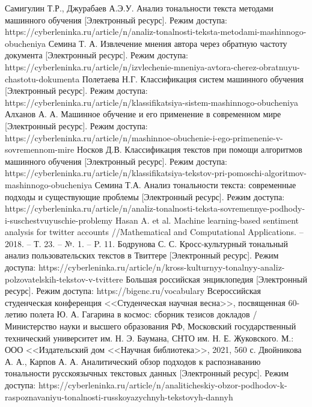 \documentclass[a4paper,14pt, unknownkeysallowed]{extreport}
\begin{document}
\begin{thebibliography}{100}
	 Самигулин Т.Р., Джурабаев А.Э.У. Анализ тональности текста методами машинного обучения [Электронный ресурс]. Режим доступа: https://cyberleninka.ru/article/n/analiz-tonalnosti-teksta-metodami-mashinnogo-obucheniya
	 Семина Т. А. Извлечение мнения автора через обратную частоту документа [Электронный ресурс]. Режим доступа: https://cyberleninka.ru/article/n/izvlechenie-mneniya-avtora-cherez-obratnuyu-chastotu-dokumenta
	 Полетаева Н.Г. Классификация систем машинного обучения [Электронный ресурс]. Режим доступа: https://cyberleninka.ru/article/n/klassifikatsiya-sistem-mashinnogo-obucheniya
	 Алханов А. А. Машинное обучение и его применение в современном мире [Электронный ресурс]. Режим доступа: https://cyberleninka.ru/article/n/mashinnoe-obuchenie-i-ego-primenenie-v-sovremennom-mire
	 Носков Д.В. Классификация текстов при помощи алгоритмов машинного обучения [Электронный ресурс]. Режим доступа: https://cyberleninka.ru/article/n/klassifikatsiya-tekstov-pri-pomoschi-algoritmov-mashinnogo-obucheniya
	 Семина Т.А. Анализ тональности текста: современные подходы и существующие проблемы [Электронный ресурс]. Режим доступа: https://cyberleninka.ru/article/n/analiz-tonalnosti-teksta-sovremennye-podhody-i-suschestvuyuschie-problemy
	 Hasan A. et al. Machine learning-based sentiment analysis for twitter accounts //Mathematical and Computational Applications. -- 2018. -- Т. 23. -- №. 1. -- P. 11.
	 Бодрунова С. С. Кросс-культурный тональный анализ пользовательских текстов в Твиттере [Электронный ресурс]. Режим доступа: https://cyberleninka.ru/article/n/kross-kulturnyy-tonalnyy-analiz-polzovatelskih-tekstov-v-tvittere
	 Большая российская энциклопедия [Электронный ресурс]. Режим доступа: https://bigenc.ru/vocabulary
	 Всероссийская студенческая конференция <<Студенческая научная весна>>, посвященная 60-летию полета Ю. А. Гагарина в космос: сборник тезисов докладов / Министерство науки и высшего образования РФ, Московский государственный технический университет им. Н. Э. Баумана, СНТО им. Н. Е. Жуковского. М.: ООО <<Издательский дом <<Научная библиотека>>, 2021, 560 с.
	 Двойникова А. А., Карпов А. А. Аналитический обзор подходов к распознаванию тональности русскоязычных текстовых данных [Электронный ресурс]. Режим доступа: https://cyberleninka.ru/article/n/analiticheskiy-obzor-podhodov-k-raspoznavaniyu-tonalnosti-russkoyazychnyh-tekstovyh-dannyh
\end{thebibliography}
\end{document}
